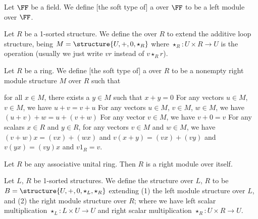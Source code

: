 \begin{definition}
Let $\FF$ be a field. We define [the soft type of] a 
over $\FF$ to be a left module over $\FF$.
\end{definition}

\begin{definition}
Let $R$ be a 1-sorted structure. We define the 
over $R$ to extend the additive loop structure, being $M=\structure{U,+,0,\star_{R}}$
where $\star_{R}\colon U\times R\to U$ is the 
operation (usually we just write $vr$ instead of $v\star_{R}r$).
\end{definition}

\begin{definition}
Let $R$ be a ring.
We define [the soft type of] a  over $R$
to be a nonempty right module structure $M$ over $R$ such that
\begin{itemize}
 for all $x\in M$, there exists a $y\in M$ such that $x+y=0$
 For any vectors
$u\in M$, $v\in M$, we have $u+v=v+u$
 For any vectors
$u\in M$, $v\in M$, $w\in M$, we have $(u+v)+w=u+(v+w)$
 For any vector $v\in M$,
we have $v+0=v$
 For any scalars $x\in R$
and $y\in R$, for any vectors $v\in M$ and $w\in M$, we have
$(v+w)x=(vx)+(wx)$ and $v(x+y)=(vx)+(vy)$ and $v(yx)=(vy)x$ and $v1_{R}=v$.
\end{itemize}
\end{definition}

\begin{example}
Let $R$ be any associative unital ring. 
Then $R$ is a right module over itself.
\end{example}

\begin{definition}
Let $L$, $R$ be 1-sorted structures.
We define the structure  over $L$, $R$ to
be $B=\structure{U,+,0,\star_{L},\star_{R}}$
extending (1) the left module structure over $L$, and (2) the right
module structure over $R$;
where
we have left scalar multiplication $\star_{L}\colon L\times U\to U$
and right scalar multiplication $\star_{R}\colon U\times R\to U$.
\end{definition}

